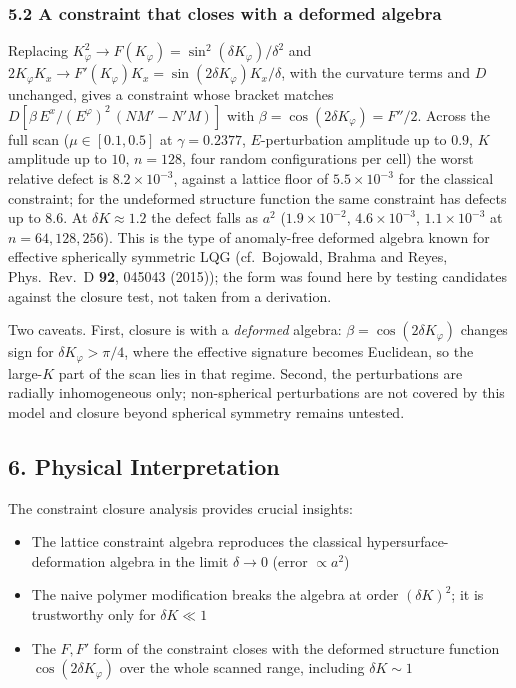 \documentclass[12pt]{article}
\begin{document}
\subsubsection*{5.2 A constraint that closes with a deformed algebra}
Replacing $K_\varphi^2\to F(K_\varphi)=\sin^2(\delta K_\varphi)/\delta^2$ and $2K_\varphi K_x\to F'(K_\varphi)K_x=\sin(2\delta K_\varphi)K_x/\delta$, with the curvature terms and $D$ unchanged, gives a constraint whose bracket matches $D[\beta\,E^x/(E^\varphi)^2\,(NM'-N'M)]$ with $\beta=\cos(2\delta K_\varphi)=F''/2$.  Across the full scan ($\mu\in[0.1,0.5]$ at $\gamma=0.2377$, $E$-perturbation amplitude up to $0.9$, $K$ amplitude up to $10$, $n=128$, four random configurations per cell) the worst relative defect is $8.2\times10^{-3}$, against a lattice floor of $5.5\times10^{-3}$ for the classical constraint; for the undeformed structure function the same constraint has defects up to $8.6$.  At $\delta K\approx1.2$ the defect falls as $a^2$ ($1.9\times10^{-2}$, $4.6\times10^{-3}$, $1.1\times10^{-3}$ at $n=64,128,256$).  This is the type of anomaly-free deformed algebra known for effective spherically symmetric LQG (cf.\ Bojowald, Brahma and Reyes, Phys.\ Rev.\ D \textbf{92}, 045043 (2015)); the form was found here by testing candidates against the closure test, not taken from a derivation.

Two caveats.  First, closure is with a \emph{deformed} algebra: $\beta=\cos(2\delta K_\varphi)$ changes sign for $\delta K_\varphi>\pi/4$, where the effective signature becomes Euclidean, so the large-$K$ part of the scan lies in that regime.  Second, the perturbations are radially inhomogeneous only; non-spherical perturbations are not covered by this model and closure beyond spherical symmetry remains untested.

\subsection*{6. Physical Interpretation}
The constraint closure analysis provides crucial insights:
\begin{itemize}
  \item The lattice constraint algebra reproduces the classical hypersurface-deformation algebra in the limit $\delta\to0$ (error $\propto a^2$)
  \item The naive polymer modification breaks the algebra at order $(\delta K)^2$; it is trustworthy only for $\delta K\ll1$
  \item The $F,F'$ form of the constraint closes with the deformed structure function $\cos(2\delta K_\varphi)$ over the whole scanned range, including $\delta K\sim1$
\end{itemize}
\end{document}
